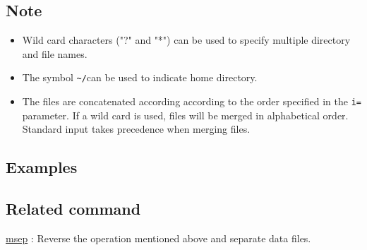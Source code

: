 \subsection*{Note}
\begin{itemize}
\item Wild card characters ("?" and "*") can be used to specify multiple directory and file names. 
\item The symbol \verb|~/|can be used to indicate home directory. 
\item The files are concatenated according according to the order specified in the \verb|i=| parameter. If a wild card is used, files will be merged in alphabetical order. Standard input takes precedence when merging files. 
\end{itemize}


\subsection*{Examples}


\subsection*{Related command}
\hyperref[sect:msep]{msep} : Reverse the operation mentioned above and separate data files. 

%
